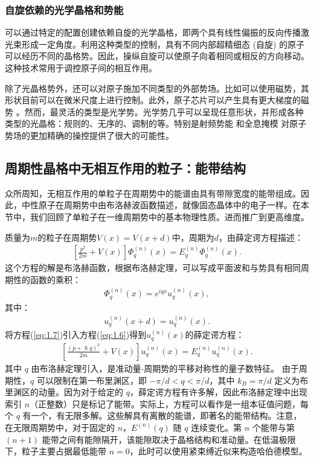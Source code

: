   \subsubsection{自旋依赖的光学晶格和势能}
可以通过特定的配置创建依赖自旋的光学晶格，即两个具有线性偏振的反向传播激光束形成一定角度。利用这种类型的控制，具有不同内部超精细态 (自旋) 的原子可以经历不同的晶格势。因此，操纵自旋可以使原子向着相同或相反的方向移动\cite{jaksch1999entanglement,mandel2003controlled}。这种技术常用于调控原子间的相互作用。

除了光晶格势外，还可以对原子施加不同类型的外部势场。比如可以使用磁势，其形状目前可以在微米尺度上进行控制。此外，原子芯片可以产生具有更大梯度的磁势 \cite{della2007designing}。然而，最灵活的类型是光学势。光学势几乎可以呈现任意形状，并形成各种类型的光晶格：规则的、无序的、调制的等。特别是射频势能 \cite{hofferberth2006radiofrequency} 和全息掩模 \cite{bakr2009quantum}对原子势场的更加精确的操控提供了很大的可能性。

  

\subsection{周期性晶格中无相互作用的粒子：能带结构}

众所周知，无相互作用的单粒子在周期势中的能谱由具有带隙宽度的能带组成。因此，中性原子在周期势中由布洛赫波函数描述，就像固态晶体中的电子一样。在本节中，我们回顾了单粒子\cite{ashcroft1976solid}在一维周期势中的基本物理性质。进而推广到更高维度。

质量为$m$的粒子在周期势$V(x) = V(x + d)$中，周期为$d$，由薛定谔方程描述：
\begin{align}
\left[ \frac{p^2}{2m} + V(x) \right] \Phi_q^{(n)}(x) = E_q^{(n)} \Phi_q^{(n)}(x). \label{eq:1.6}
\end{align}
这个方程的解是布洛赫函数，根据布洛赫定理\cite{ashcroft1976solid}，可以写成平面波和与势具有相同周期性的函数的乘积：
\begin{align}
\Phi_q^{(n)}(x) = e^{iqx} u_q^{(n)}(x), \label{eq:1.7}
\end{align}
其中：
\begin{align}
u_q^{(n)}(x + d) = u_q^{(n)}(x). \label{eq:1.8}
\end{align}
将方程(\ref{eq:1.7})引入方程(\ref{eq:1.6})得到$u_q^{(n)}(x)$的薛定谔方程：
\begin{align}
\left[ \frac{(p + \hslash {q})^2}{2m} + V(x) \right] u_q^{(n)}(x) = E_q^{(n)} u_q^{(n)}(x). \label{eq:1.9}
\end{align}
其中 \( q \) 由布洛赫定理引入，是准动量-周期势的平移对称性的量子数特征。
由于周期性，\( q \) 可以限制在第一布里渊区，即 \(-\pi/d < q < \pi/d\)，其中 \( k_B = \pi/d \) 定义为布里渊区的动量。因为对于给定的 \( q \)，薛定谔方程有许多解，因此布洛赫定理中出现索引 \( n \)（正整数）只是标记了能带。实际上，方程可以看作是一组本征值问题，每个 \( q \) 有一个，有无限多解。这些解具有离散的能谱，即著名的能带结构。注意，在无限周期势中，对于固定的 \( n \)，\( E^{(n)}(q) \) 随 \( q \) 连续变化。第 \( n \) 个能带与第 \( (n+1) \) 能带之间有能隙隔开，该能隙取决于晶格结构和准动量。在低温极限下，粒子主要占据最低能带 \( n = 0 \)，此时可以使用紧束缚近似来构造哈伯德模型。


